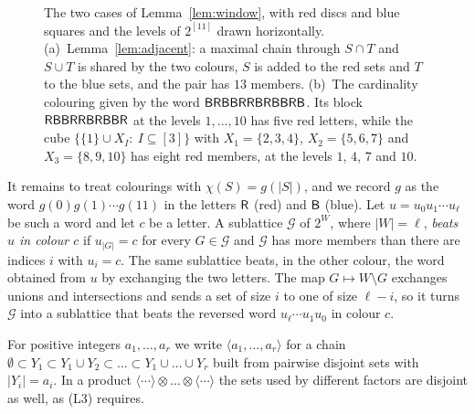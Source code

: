 \documentclass[11pt,reqno]{amsart}
\numberwithin{equation}{section}
\theoremstyle{plain}
\theoremstyle{definition}
\theoremstyle{remark}
\newcommand{\w}[1]{\textsf{\upshape #1}}
\newcommand{\cG}{\mathcal{G}}
\begin{document}
\begin{figure}[t]
\centering

\caption{The two cases of Lemma~\ref{lem:window}, with red discs and
blue squares and the levels of $2^{[11]}$ drawn horizontally.
(a)~Lemma~\ref{lem:adjacent}: a maximal chain through $S\cap T$ and
$S\cup T$ is shared by the two colours, $S$ is added to the red sets and
$T$ to the blue sets, and the pair has $13$ members. (b)~The cardinality
colouring given by the word $\w{BRBBRRBRBBRB}$. Its block
$\w{RBBRRBRBBR}$ at the levels $1,\dots,10$ has five red letters, while
the cube $\{\{1\}\cup X_I:\ I\subseteq[3]\}$ with $X_1=\{2,3,4\}$,
$X_2=\{5,6,7\}$ and $X_3=\{8,9,10\}$ has eight red members, at the levels
$1$, $4$, $7$ and $10$.}
\label{fig:window}
\end{figure}

It remains to treat colourings with $\chi(S)=g(|S|)$, and we record $g$
as the word $g(0)g(1)\cdots g(11)$ in the letters $\w{R}$ (red) and
$\w{B}$ (blue). Let $u=u_0u_1\cdots u_\ell$ be such a word and let $c$ be
a letter. A sublattice $\cG$ of $2^{W}$, where $|W|=\ell$, \emph{beats $u$
in colour $c$} if $u_{|G|}=c$ for every $G\in\cG$ and $\cG$ has more
members than there are indices $i$ with $u_i=c$. The same sublattice
beats, in the other colour, the word obtained from $u$ by exchanging the
two letters. The map $G\mapsto W\setminus G$ exchanges unions and
intersections and sends a set of size $i$ to one of size $\ell-i$, so it
turns $\cG$ into a sublattice that beats the reversed word
$u_\ell\cdots u_1u_0$ in colour $c$.

For positive integers $a_1,\dots,a_r$ we write $\langle
a_1,\dots,a_r\rangle$ for a chain $\emptyset\subset Y_1\subset Y_1\cup
Y_2\subset\dots\subset Y_1\cup\dots\cup Y_r$ built from pairwise disjoint
sets with $|Y_i|=a_i$. In a product $\langle\cdots\rangle\otimes\dots
\otimes\langle\cdots\rangle$ the sets used by different factors are
disjoint as well, as (L3) requires.
\end{document}
